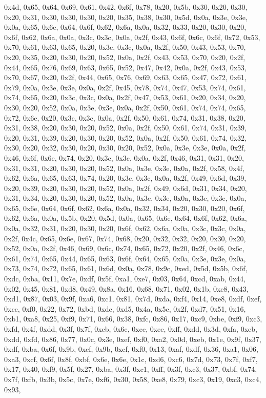 \documentclass[
]{book}
\begin{document}
0x4d, 0x65, 0x64, 0x69, 0x61, 0x42, 0x6f, 0x78, 0x20, 0x5b, 0x30, 0x20, 0x30, 0x20, 0x31, 0x30, 0x30, 0x30, 0x20, 0x35, 0x38, 0x30, 0x5d, 0x0a, 0x3e, 0x3e, 0x0a, 0x65, 0x6e, 0x64, 0x6f, 0x62, 0x6a, 0x0a, 0x32, 0x33, 0x20, 0x30, 0x20, 0x6f, 0x62, 0x6a, 0x0a, 0x3c, 0x3c, 0x0a, 0x2f, 0x43, 0x6f, 0x6c, 0x6f, 0x72, 0x53, 0x70, 0x61, 0x63, 0x65, 0x20, 0x3c, 0x3c, 0x0a, 0x2f, 0x50, 0x43, 0x53, 0x70, 0x20, 0x35, 0x20, 0x30, 0x20, 0x52, 0x0a, 0x2f, 0x43, 0x53, 0x70, 0x20, 0x2f, 0x44, 0x65, 0x76, 0x69, 0x63,
0x65, 0x52, 0x47, 0x42, 0x0a, 0x2f, 0x43, 0x53, 0x70, 0x67, 0x20, 0x2f, 0x44, 0x65, 0x76, 0x69, 0x63, 0x65, 0x47, 0x72, 0x61, 0x79, 0x0a, 0x3e, 0x3e, 0x0a, 0x2f, 0x45, 0x78, 0x74, 0x47, 0x53, 0x74, 0x61, 0x74, 0x65, 0x20, 0x3c, 0x3c, 0x0a, 0x2f, 0x47, 0x53, 0x61, 0x20, 0x34, 0x20, 0x30, 0x20, 0x52, 0x0a, 0x3e, 0x3e, 0x0a, 0x2f, 0x50, 0x61, 0x74, 0x74, 0x65, 0x72, 0x6e, 0x20, 0x3c, 0x3c, 0x0a, 0x2f, 0x50, 0x61, 0x74, 0x31, 0x38, 0x20, 0x31, 0x38, 0x20, 0x30, 0x20, 0x52, 0x0a, 0x2f, 0x50, 0x61, 0x74,
0x31, 0x39, 0x20, 0x31, 0x39, 0x20, 0x30, 0x20, 0x52, 0x0a, 0x2f, 0x50, 0x61, 0x74, 0x32, 0x30, 0x20, 0x32, 0x30, 0x20, 0x30, 0x20, 0x52, 0x0a, 0x3e, 0x3e, 0x0a, 0x2f, 0x46, 0x6f, 0x6e, 0x74, 0x20, 0x3c, 0x3c, 0x0a, 0x2f, 0x46, 0x31, 0x31, 0x20, 0x31, 0x31, 0x20, 0x30, 0x20, 0x52, 0x0a, 0x3e, 0x3e, 0x0a, 0x2f, 0x58, 0x4f, 0x62, 0x6a, 0x65, 0x63, 0x74, 0x20, 0x3c, 0x3c, 0x0a, 0x2f, 0x49, 0x6d, 0x39, 0x20, 0x39, 0x20, 0x30, 0x20, 0x52, 0x0a, 0x2f, 0x49, 0x6d, 0x31, 0x34, 0x20, 0x31, 0x34, 0x20, 0x30,
0x20, 0x52, 0x0a, 0x3e, 0x3e, 0x0a, 0x3e, 0x3e, 0x0a, 0x65, 0x6e, 0x64, 0x6f, 0x62, 0x6a, 0x0a, 0x32, 0x34, 0x20, 0x30, 0x20, 0x6f, 0x62, 0x6a, 0x0a, 0x5b, 0x20, 0x5d, 0x0a, 0x65, 0x6e, 0x64, 0x6f, 0x62, 0x6a, 0x0a, 0x32, 0x31, 0x20, 0x30, 0x20, 0x6f, 0x62, 0x6a, 0x0a, 0x3c, 0x3c, 0x0a, 0x2f, 0x4c, 0x65, 0x6e, 0x67, 0x74, 0x68, 0x20, 0x32, 0x32, 0x20, 0x30, 0x20, 0x52, 0x0a, 0x2f, 0x46, 0x69, 0x6c, 0x74, 0x65, 0x72, 0x20, 0x2f, 0x46, 0x6c, 0x61, 0x74, 0x65, 0x44, 0x65, 0x63, 0x6f, 0x64, 0x65, 0x0a,
0x3e, 0x3e, 0x0a, 0x73, 0x74, 0x72, 0x65, 0x61, 0x6d, 0x0a, 0x78, 0x9c, 0xed, 0x5d, 0x5b, 0x6f, 0xdc, 0xba, 0x11, 0x7e, 0xdf, 0x5f, 0xa1, 0xe7, 0x03, 0x64, 0xcd, 0xab, 0x44, 0x02, 0x45, 0x81, 0xd8, 0x49, 0x8a, 0x16, 0x68, 0x71, 0x02, 0x1b, 0xe8, 0x43, 0xd1, 0x87, 0x03, 0x9f, 0xa6, 0xc1, 0x81, 0x7d, 0xda, 0xf4, 0x14, 0xe8, 0xdf, 0xef, 0xcc, 0xf0, 0x22, 0x72, 0xbd, 0xdc, 0xd5, 0x4a, 0x5c, 0x2f, 0xd7, 0x51, 0x16, 0xb1, 0xa8, 0x25, 0xf9, 0x71, 0x66, 0x38, 0xfc, 0x86, 0x17, 0xc9, 0xbe, 0xf9, 0xc3, 0xfd,
0x4f, 0xdd, 0x3f, 0x7f, 0xeb, 0x6e, 0xee, 0xee, 0xff, 0xdd, 0x3d, 0xfa, 0xeb, 0xdd, 0xfd, 0x86, 0x77, 0x0c, 0x3e, 0xef, 0xf0, 0xa2, 0x0d, 0xeb, 0x1e, 0x9f, 0x37, 0xdf, 0xba, 0x6f, 0x9b, 0xcf, 0x9b, 0xcf, 0xf0, 0x13, 0xaf, 0xdf, 0x36, 0xa1, 0x06, 0xa3, 0xcf, 0x6f, 0x8f, 0xbf, 0x6e, 0x6e, 0x1c, 0xd6, 0xc6, 0x7d, 0x73, 0x7f, 0xf7, 0x17, 0x40, 0xf9, 0x5f, 0x27, 0xba, 0x3f, 0xc1, 0xff, 0x3f, 0xc3, 0x37, 0xbf, 0x74, 0x7f, 0xfb, 0x3b, 0x5c, 0x7e, 0xf6, 0x30, 0x58, 0xe8, 0x79, 0xc3, 0x19, 0xc3, 0xc4, 0x93,
\end{document}
